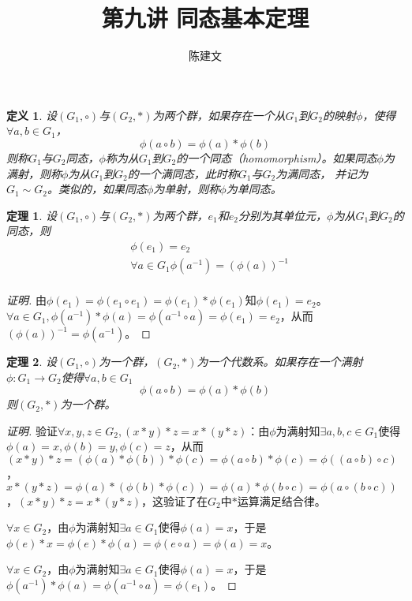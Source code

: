 \documentclass{article}
\newtheorem{Def}{定义}
\newtheorem{Thm}{定理}
\begin{document}
\begin{CJK*}{UTF8}{gbsn}
  \title{第九讲 同态基本定理}
  \author{陈建文}
  \maketitle
  
  \begin{Def}
    设$(G_1,\circ)$与$(G_2,*)$为两个群，如果存在一个从$G_1$到$G_2$的映射$\phi$，使得$\forall a,b\in G_1$，\[\phi(a\circ b)=\phi(a)* \phi(b)\]
    则称$G_1$与$G_2$同态，$\phi$称为从$G_1$到$G_2$的一个同态（homomorphism）。如果同态$\phi$为满射，则称$\phi$为从$G_1$到$G_2$的一个满同态，此时称$G_1$与$G_2$为满同态，
    并记为$G_1\sim G_2$。类似的，如果同态$\phi$为单射，则称$\phi$为单同态。
  \end{Def}
  
  \begin{Thm}
    设$(G_1,\circ)$与$(G_2,*)$为两个群，$e_1$和$e_2$分别为其单位元，$\phi$为从$G_1$到$G_2$的同态，则
    \begin{align*}
      &\phi(e_1)=e_2\\
      &\forall a\in G_1 \phi(a^{-1})=(\phi(a))^{-1}\\
    \end{align*}
  \end{Thm}
  \begin{proof}[证明]
    由$\phi(e_1)=\phi(e_1\circ e_1)=\phi(e_1)*\phi(e_1)$知$\phi(e_1)=e_2$。
    $\forall a\in G_1, \phi(a^{-1})*\phi(a)=\phi(a^{-1}\circ a)=\phi(e_1)=e_2$，从而$(\phi(a))^{-1}=\phi(a^{-1})$。
  \end{proof}
  \begin{Thm}
    设$(G_1,\circ)$为一个群，$(G_2,*)$为一个代数系。如果存在一个满射$\phi:G_1\to G_2$使得$\forall a,b\in G_1$
    \[\phi(a\circ b)=\phi(a) * \phi(b)\]
    则$(G_2,*)$为一个群。
  \end{Thm}
  \begin{proof}[证明]
    验证$\forall x,y,z\in G_2,(x*y)*z=x*(y*z)$：由$\phi$为满射知$\exists a,b,c\in G_1$使得$\phi(a)=x,\phi(b)=y,\phi(c)=z$，从而
    $(x*y)*z=(\phi(a)*\phi(b))*\phi(c)=\phi(a\circ b)*\phi(c)=\phi((a\circ b)\circ c)$，$x*(y*z)=\phi(a)* (\phi(b)*\phi(c))=\phi(a)*\phi(b\circ c)=\phi(a\circ (b\circ c))$，$(x*y)*z=x*(y*z)$，这验证了在$G_2$中$*$运算满足结合律。
  
    $\forall x\in G_2$，由$\phi$为满射知$\exists a\in G_1$使得$\phi(a)=x$，于是$\phi(e)*x=\phi(e)*\phi(a)=\phi(e\circ a)=\phi(a)=x$。
  
    $\forall x\in G_2$，由$\phi$为满射知$\exists a\in G_1$使得$\phi(a)=x$，于是$\phi(a^{-1})*\phi(a)=\phi(a^{-1}\circ a)=\phi(e_1)$。
  \end{proof}
  

\end{CJK*}
\end{document}
